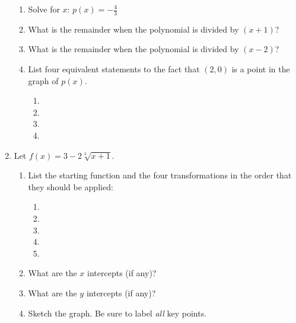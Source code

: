 \documentclass[letterpaper,12pt,fleqn]{article}
\begin{document}
\begin{enumerate}
  \begin{enumerate}
  \item Solve for $x$: $p(x)=-\frac{4}{3}$

    \vspace{1in}
    
  \item What is the remainder when the polynomial is divided by $(x+1)$?

    \vspace{1in}
    
  \item What is the remainder when the polynomial is divided by $(x-2)$?

    \vspace{1in}
    
  \item List four equivalent statements to the fact that $(2,0)$ is a point
    in the graph of $p(x)$.
    \begin{enumerate}
    \item
    \item
    \item
    \item
    \end{enumerate}
  \end{enumerate}

  \newpage

\item Let $f(x)=3-2\sqrt[3]{x+1}$.
  \begin{enumerate}
  \item List the starting function and the four transformations in the order
    that they should be applied:
    \begin{enumerate}
      \item
      \item
      \item
      \item
      \item
    \end{enumerate}
  \item What are the $x$ intercepts (if any)?

    \vspace{2in}
    
  \item What are the $y$ intercepts (if any)?

    \vspace{1in}
    
  \item Sketch the graph. Be sure to label \emph{all} key points.


\end{enumerate}
\end{enumerate}
\end{document}
